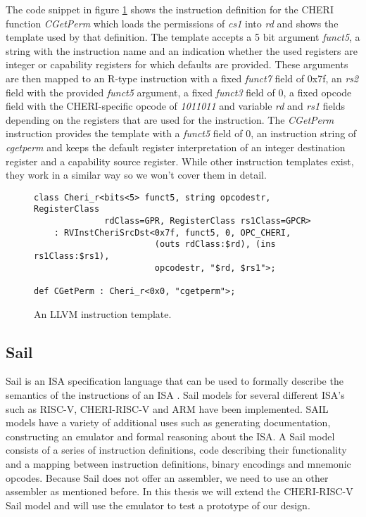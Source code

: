 The code snippet in figure \ref{fig:insttemplate} shows the instruction definition for the CHERI function \textit{CGetPerm} which loads the permissions of \textit{cs1} into \textit{rd} and shows the template used by that definition.
The template accepts a 5 bit argument \textit{funct5}, a string with the instruction name and an indication whether the used registers are integer or capability registers for which defaults are provided.
These arguments are then mapped to an R-type instruction with a fixed \textit{funct7} field of 0x7f, an \textit{rs2} field with the provided \textit{funct5} argument, a fixed \textit{funct3} field of 0, a fixed opcode field with the CHERI-specific opcode of \textit{1011011} and variable \textit{rd} and \textit{rs1} fields depending on the registers that are used for the instruction.
The \textit{CGetPerm} instruction provides the template with a \textit{funct5} field of 0, an instruction string of \textit{cgetperm} and keeps the default register interpretation of an integer destination register and a capability source register.
While other instruction templates exist, they work in a similar way so we won't cover them in detail.

\begin{figure}[h]
\begin{verbatim}
class Cheri_r<bits<5> funct5, string opcodestr, RegisterClass
              rdClass=GPR, RegisterClass rs1Class=GPCR>
    : RVInstCheriSrcDst<0x7f, funct5, 0, OPC_CHERI,
                        (outs rdClass:$rd), (ins rs1Class:$rs1),
                        opcodestr, "$rd, $rs1">;

def CGetPerm : Cheri_r<0x0, "cgetperm">;
\end{verbatim}
\caption{An LLVM instruction template.}
\label{fig:insttemplate}
\end{figure}

\subsection{Sail}
Sail is an ISA specification language that can be used to formally describe the semantics of the instructions of an ISA \cite{10.1145/3290384}. Sail models for several different ISA's such as RISC-V, CHERI-RISC-V and ARM have been implemented. SAIL models have a variety of additional uses such as generating documentation, constructing an emulator and formal reasoning about the ISA.
A Sail model consists of a series of instruction definitions, code describing their functionality and a mapping between instruction definitions, binary encodings and mnemonic opcodes.
Because Sail does not offer an assembler, we need to use an other assembler as mentioned before.
In this thesis we will extend the CHERI-RISC-V Sail model and will use the emulator to test a prototype of our design.

